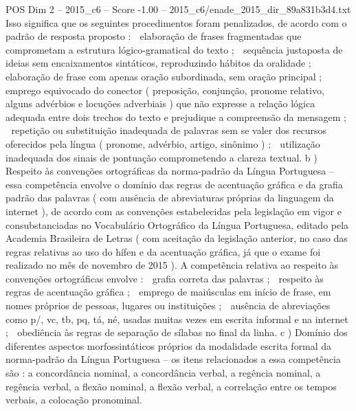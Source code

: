 \begin{textsample}{POS Dim 2 – 2015\_c6 – Score -1.00 – 2015\_c6/enade\_2015\_dir\_89a831b3d4.txt}
Isso significa que os seguintes procedimentos foram penalizados, de acordo com o padrão de resposta proposto :  elaboração de frases fragmentadas que comprometam a estrutura lógico-gramatical do texto ;  sequência justaposta de ideias sem encaixamentos sintáticos, reproduzindo hábitos da oralidade ;  elaboração de frase com apenas oração subordinada, sem oração principal ;  emprego equivocado do conector ( preposição, conjunção, pronome relativo, alguns advérbios e locuções adverbiais ) que não expresse a relação lógica adequada entre dois trechos do texto e prejudique a compreensão da mensagem ;  repetição ou substituição inadequada de palavras sem se valer dos recursos oferecidos pela língua ( pronome, advérbio, artigo, sinônimo ) ;  utilização inadequada dos sinais de pontuação comprometendo a clareza textual. b ) Respeito às convenções ortográficas da norma-padrão da Língua Portuguesa – essa competência envolve o domínio das regras de acentuação gráfica e da grafia padrão das palavras ( com ausência de abreviaturas próprias da linguagem da internet ), de acordo com as convenções estabelecidas pela legislação em vigor e consubstanciadas no Vocabulário Ortográfico da Língua Portuguesa, editado pela Academia Brasileira de Letras ( com aceitação da legislação anterior, no caso das regras relativas ao uso do hífen e da acentuação gráfica, já que o exame foi realizado no mês de novembro de 2015 ).
A competência relativa ao respeito às convenções ortográficas envolve :  grafia correta das palavras ;  respeito às regras de acentuação gráfica ;  emprego de maiúsculas em início de frase, em nomes próprios de pessoas, lugares ou instituições ;  ausência de abreviações como p/, vc, tb, pq, tá, né, usadas muitas vezes em escrita informal e na internet ;  obediência às regras de separação de sílabas no final da linha. c ) Domínio dos diferentes aspectos morfossintáticos próprios da modalidade escrita formal da norma-padrão da Língua Portuguesa – os itens relacionados a essa competência são : a concordância nominal, a concordância verbal, a regência nominal, a regência verbal, a flexão nominal, a flexão verbal, a correlação entre os tempos verbais, a colocação pronominal.

\end{textsample}
